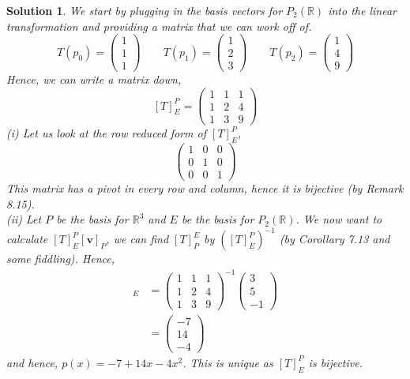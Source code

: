 \documentclass{article}
\newcommand{\R}{\mathbb{R}}
\renewcommand{\vec}[1]{\boldsymbol{\mathbf{#1}}}
\newcommand{\thbth}[9]{\begin{pmatrix} #1 & #2 & #3 \\ #4 & #5 & #6 \\ #7 & #8 & #9\end{pmatrix}}
\newcommand{\iid}{\thbth 1 0 0 0 1 0 0 0 1}
\newtheorem{solution}{Solution}
\begin{document}
\begin{solution}
  We start by plugging in the basis vectors for $P_2(\R)$ into the linear transformation and providing a matrix that we can work off of.
  $$ T(p_0) = \begin{pmatrix}
    1 \\ 1 \\ 1
  \end{pmatrix} \qquad T(p_1) = \begin{pmatrix}
    1 \\ 2 \\ 3
  \end{pmatrix} \qquad T(p_2) = \begin{pmatrix}
    1 \\ 4 \\ 9
  \end{pmatrix}$$
  Hence, we can write a matrix down,
  $$ [T]_E^P = \begin{pmatrix}
    1 & 1 & 1 \\
    1 & 2 & 4 \\
    1 & 3 & 9
  \end{pmatrix} $$
  (i) \quad Let us look at the row reduced form of $[T]_E^P$,
  $$ \iid $$
  This matrix has a pivot in every row and column, hence it is bijective (by Remark 8.15).\\


  \noindent
  (ii) \quad Let $P$ be the basis for $\R^3$ and $E$ be the basis for $P_2(\R)$. We now want to calculate $[T]_E^P [\vec v]_P$, we can find $[T]_P^E$ by $([T]_E^P)^{-1}$ (by Corollary 7.13 and some fiddling). Hence,
  \begin{align*}
    [\vec v]_E &= \begin{pmatrix}
      1 & 1 & 1 \\
      1 & 2 & 4 \\
      1 & 3 & 9
  \end{pmatrix}^{-1}
  \begin{pmatrix}
    3 \\ 5 \\ -1
  \end{pmatrix}\\
  &= \begin{pmatrix}
    -7 \\ 14 \\ -4
\end{pmatrix}
  \end{align*}
  and hence, $p(x) = -7 + 14x - 4x^2$. This is unique as $[T]_E^P$ is bijective.
\end{solution}
\end{document}
